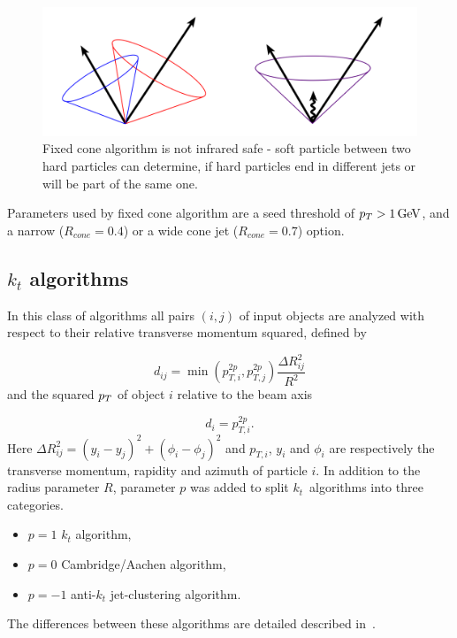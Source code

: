 \begin{figure}[t]
  \centering
  \includegraphics[width=\textwidth]{Chapter2/IRsafety}
  \caption{Fixed cone algorithm is not infrared safe - soft particle between two
  hard particles can determine, if hard particles end in different jets or will
  be part of the same one.} \label{fig:IRsafety}
\end{figure}

Parameters used by fixed cone algorithm are a seed threshold of $p_T > 1 \,\text{GeV}$,
and a narrow ($R_{cone} = 0.4$) or a wide cone jet ($R_{cone} = 0.7$) option.

\subsection{$k_t$ algorithms}

In this class of algorithms all pairs $(i,j)$ of input objects are analyzed with
respect to their relative transverse momentum squared, defined by 

\begin{equation}
	d_{ij} = \min{\left( p_{T,i}^{2p} , p_{T,j}^{2p} \right)} \frac{\Delta R_{ij}^2}{R^2}
\end{equation}
and the squared $p_T$ of object $i$ relative to the beam axis

\begin{equation}
	d_i = p_{T,i}^{2p}.
\end{equation}
Here $\Delta R_{ij}^2 = (y_i - y_j)^2 + (\phi_i - \phi_j)^2$ and $p_{T,i}$,
$y_i$ and $\phi_i$ are respectively the transverse momentum, rapidity and
azimuth of particle $i$. In addition to the radius parameter $R$, parameter $p$
was added to split $k_t$~algorithms into three categories.  
\begin{itemize}
	\setlength{\itemsep}{0pt}
	\setlength{\parskip}{0pt}
	\setlength{\parsep}{0pt}
	\item $p = 1$ $k_t$ algorithm,
	\item $p = 0$ Cambridge/Aachen algorithm,
	\item $p = -1$ anti-$k_t$ jet-clustering algorithm.
\end{itemize}
The differences between these algorithms are detailed described in~\cite{ANTIKT}.  

